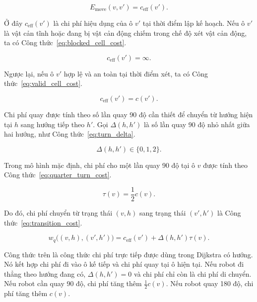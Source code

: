 \documentclass[../DoAn.tex]{subfiles}
\begin{document}
\begin{equation}
    E_{\text{move}}(v,v') = c_{\text{eff}}(v').
    \label{eq:move_energy}
\end{equation}

Ở đây $c_{\text{eff}}(v')$ là chi phí hiệu dụng của ô $v'$ tại thời điểm lập kế hoạch. Nếu ô $v'$ là vật cản tĩnh hoặc đang bị vật cản động chiếm trong chế độ xét vật cản động, ta có Công thức~\ref{eq:blocked_cell_cost}.

\begin{equation}
    c_{\text{eff}}(v') = \infty.
    \label{eq:blocked_cell_cost}
\end{equation}

Ngược lại, nếu ô $v'$ hợp lệ và an toàn tại thời điểm xét, ta có Công thức~\ref{eq:valid_cell_cost}.

\begin{equation}
    c_{\text{eff}}(v') = c(v').
    \label{eq:valid_cell_cost}
\end{equation}

Chi phí quay được tính theo số lần quay 90 độ cần thiết để chuyển từ hướng hiện tại $h$ sang hướng tiếp theo $h'$. Gọi $\Delta(h,h')$ là số lần quay 90 độ nhỏ nhất giữa hai hướng, như Công thức~\ref{eq:turn_delta}.

\begin{equation}
    \Delta(h,h') \in \{0,1,2\}.
    \label{eq:turn_delta}
\end{equation}

Trong mô hình mặc định, chi phí cho một lần quay 90 độ tại ô $v$ được tính theo Công thức~\ref{eq:quarter_turn_cost}.

\begin{equation}
    \tau(v)=\frac{1}{2}c(v).
    \label{eq:quarter_turn_cost}
\end{equation}

Do đó, chi phí chuyển từ trạng thái $(v,h)$ sang trạng thái $(v',h')$ là Công thức~\ref{eq:transition_cost}.

\begin{equation}
    w_q\bigl((v,h),(v',h')\bigr)=c_{\text{eff}}(v')+\Delta(h,h')\tau(v).
    \label{eq:transition_cost}
\end{equation}

Công thức trên là công thức chi phí trực tiếp được dùng trong Dijkstra có hướng. Nó kết hợp chi phí đi vào ô kế tiếp và chi phí quay tại ô hiện tại. Nếu robot đi thẳng theo hướng đang có, $\Delta(h,h')=0$ và chi phí chỉ còn là chi phí di chuyển. Nếu robot cần quay 90 độ, chi phí tăng thêm $\frac{1}{2}c(v)$. Nếu robot quay 180 độ, chi phí tăng thêm $c(v)$.
\end{document}
